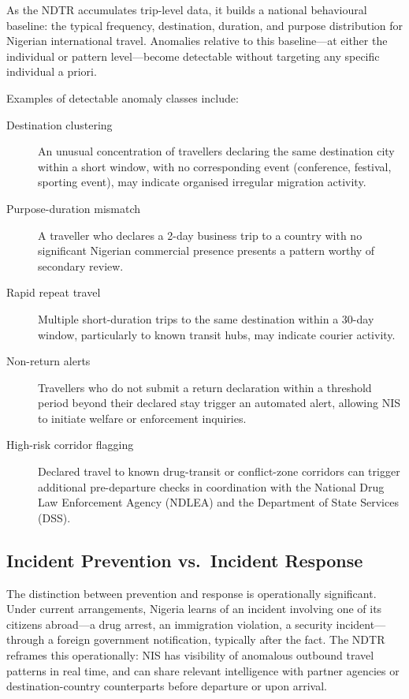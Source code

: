 \documentclass[11pt]{article}
\begin{document}
As the NDTR accumulates trip-level data, it builds a national
behavioural baseline: the typical frequency, destination, duration,
and purpose distribution for Nigerian international travel. Anomalies
relative to this baseline---at either the individual or pattern
level---become detectable without targeting any specific individual
a priori.

Examples of detectable anomaly classes include:

\begin{description}
  \item[Destination clustering] An unusual concentration of travellers
  declaring the same destination city within a short window, with
  no corresponding event (conference, festival, sporting event), may
  indicate organised irregular migration activity.

  \item[Purpose-duration mismatch] A traveller who declares a
  2-day business trip to a country with no significant Nigerian
  commercial presence presents a pattern worthy of secondary review.

  \item[Rapid repeat travel] Multiple short-duration trips to the
  same destination within a 30-day window, particularly to known
  transit hubs, may indicate courier activity.

  \item[Non-return alerts] Travellers who do not submit a return
  declaration within a threshold period beyond their declared
  stay trigger an automated alert, allowing NIS to initiate
  welfare or enforcement inquiries.

  \item[High-risk corridor flagging] Declared travel to known
  drug-transit or conflict-zone corridors can trigger additional
  pre-departure checks in coordination with the National Drug Law
  Enforcement Agency (NDLEA) and the Department of State Services
  (DSS).
\end{description}

\subsection{Incident Prevention vs.\ Incident Response}

The distinction between prevention and response is operationally
significant.
Under current arrangements, Nigeria learns of an incident involving
one of its citizens abroad---a drug arrest, an immigration
violation, a security incident---through a foreign government
notification, typically after the fact. The NDTR reframes this
operationally: NIS has visibility of anomalous outbound travel
patterns in real time, and can share relevant intelligence with
partner agencies or destination-country counterparts before
departure or upon arrival.
\end{document}
